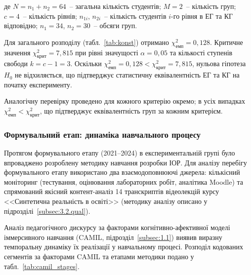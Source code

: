 \noindent де $N = n_1 + n_2 = 64$~-- загальна кількість студентів; $M = 2$~-- кількість груп; $c = 4$~-- кількість рівнів; $n_{1i}$, $n_{2i}$~-- кількість студентів $i$-го рівня в ЕГ та КГ відповідно; $n_1 = 34$, $n_2 = 30$~-- обсяги груп.

Для загального розподілу (табл.~\ref{tab:konst}) отримано $\chi^2_{\text{емп}} = 0{,}128$. Критичне значення $\chi^2_{\text{крит}} = 7{,}815$ при рівні значущості $\alpha = 0{,}05$ та кількості ступенів свободи $k = c - 1 = 3$. Оскільки $\chi^2_{\text{емп}} = 0{,}128 < \chi^2_{\text{крит}} = 7{,}815$, нульова гіпотеза $H_0$ не відхиляється, що підтверджує статистичну еквівалентність ЕГ та КГ на початку експерименту.

Аналогічну перевірку проведено для кожного критерію окремо; в усіх випадках $\chi^2_{\text{емп}} < \chi^2_{\text{крит}}$, що підтверджує еквівалентність груп за кожним критерієм.


\subsubsection{Формувальний етап: динаміка навчального процесу}

Протягом формувального етапу (2021--2024) в експериментальній групі було впроваджено розроблену методику навчання розробки ІОР. Для аналізу перебігу формувального етапу використано два взаємодоповнюючі джерела: кількісний моніторинг (тестування, оцінювання лабораторних робіт, аналітика Moodle) та спрямований якісний контент-аналіз 14 транскриптів відеолекцій курсу <<Синтетична реальність в освіті>> (методику аналізу описано у підрозділі~\ref{subsec:3.2.qual}).


Аналіз педагогічного дискурсу за факторами когнітивно-афективної моделі іммерсивного навчання (CAMIL, підрозділ~\ref{subsec:1.1}) виявив виразну темпоральну динаміку їх реалізації у навчальному процесі. Розподіл кодованих сегментів за факторами CAMIL та етапами методики подано у табл.~\ref{tab:camil_stages}.

